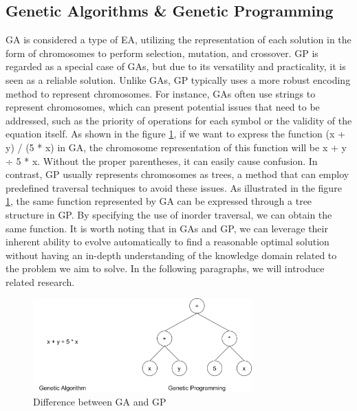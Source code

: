 \begin{ZhChapter}
    \subsection{Genetic Algorithms \& Genetic Programming}
    GA is considered a type of EA, utilizing the representation of each solution in the form of chromosomes to perform selection, mutation, and crossover. GP is regarded as a special case of GAs, but due to its versatility and practicality, it is seen as a reliable solution. Unlike GAs, GP typically uses a more robust encoding method to represent chromosomes. For instance, GAs often use strings to represent chromosomes, which can present potential issues that need to be addressed, such as the priority of operations for each symbol or the validity of the equation itself. As shown in the figure \ref{fig: GPandGA}, if we want to express the function (x + y) / (5 * x) in GA, the chromosome representation of this function will be x + y ÷ 5 * x. Without the proper parentheses, it can easily cause confusion. In contrast, GP usually represents chromosomes as trees, a method that can employ predefined traversal techniques to avoid these issues. As illustrated in the figure \ref{fig: GPandGA}, the same function represented by GA can be expressed through a tree structure in GP. By specifying the use of inorder traversal, we can obtain the same function. It is worth noting that in GAs and GP, we can leverage their inherent ability to evolve automatically to find a reasonable optimal solution without having an in-depth understanding of the knowledge domain related to the problem we aim to solve. In the following paragraphs, we will introduce related research.

    \begin{figure}[htbp]
        \centering
        \includegraphics[width = 0.75\textwidth]{image/GPandGA.png}
        \caption{Difference between GA and GP}
        \label{fig: GPandGA}
    \end{figure}


\end{ZhChapter}
